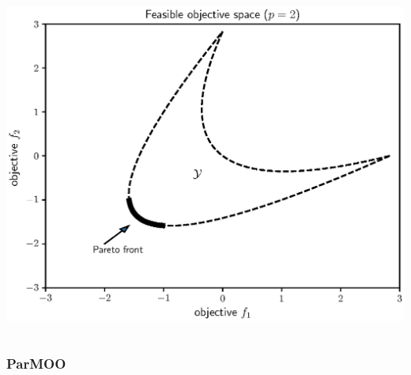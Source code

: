 \documentclass[aspectratio=169]{beamer}
\begin{document}
\begin{frame}
{\begin{columns}
\begin{column}{.35\textwidth}
\includegraphics[width=\textwidth]{convex_pareto.eps}
\end{column}
\end{columns}
}
\end{frame}

\begin{frame}\frametitle{ParMOO}
\begin{center}

\vskip -2in

\end{center}
\end{frame}
\end{document}
